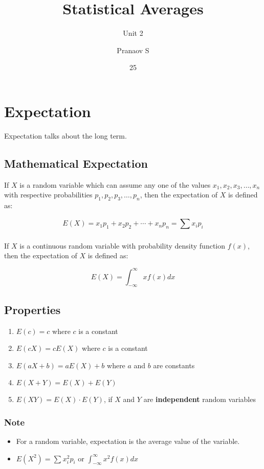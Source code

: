 \documentclass[english,course]{lecture}
\title{Statistical Averages}
\subtitle{Unit 2}
\author{Pranaov S}
\date{25}{02}{2025}
\begin{document}
\newpage

\section{Expectation}

Expectation talks about the long term.

\subsection{Mathematical Expectation}

If $X$ is a random variable which can assume any one of the values $x_{1}, x_{2}, x_{3}, \dots, x_{n}$
with respective probabilities $p_1, p_2, p_3, \dots, p_n$, then the expectation of $X$ is defined as:

\[
  E(X) = x_{1}p_1 + x_{2} p_2 + \cdots + x_n p_n = \sum_{}^{}x_i p_i
\]

If $X$ is a continuous random variable with probability density function $f(x)$, then the expectation of $X$ is defined as:

\[
  E(X) = \int_{-\infty}^{\infty} x f(x) dx
\]

\subsection{Properties}

\begin{enumerate}
  \item $E(c) = c$ where $c$ is a constant
  \item $E(cX) = cE(X)$ where $c$ is a constant
  \item $E(aX + b) = aE(X) + b$ where $a$ and $b$ are constants
  \item $E(X + Y) = E(X) + E(Y)$
  \item $E(XY) = E(X) \cdot E(Y)$, if $X$ and $Y$ are \textbf{independent} random variables
\end{enumerate}

\subsubsection*{Note}

\begin{itemize}
  \item For a random variable, expectation is the average value of the variable.
  \item $E(X^2) = \sum_{}^{}x_i^2 p_i$ or $\int_{-\infty}^{\infty} x^2 f(x) dx$
\end{itemize}
\end{document}
